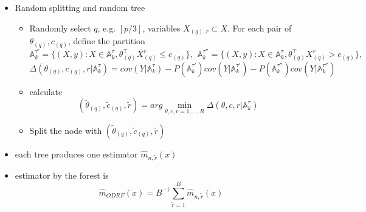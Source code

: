 \documentclass[nojss]{jss}
\numberwithin{equation}{section}
\begin{document}
\begin{itemize}

\item Random splitting and random tree
\begin{itemize}

  \item Randomly select $q$, e.g. $[p/3]$, variables $  X_{(q), r} \subset X $.   For each pair of $ \theta_{(q)},c_{(q)} $, define the partition
  $$
    \mathbb{A}_{k}^{\tau'} = \{ (X, y): X \in \mathbb{A}_k^\tau, \theta_{(q)}^\top X_{(q)}^r \le c_{(q)}\}, \ \
    \mathbb{A}_{k}^{\tau''} = \{ (X, y): X \in \mathbb{A}_k^\tau, \theta_{(q)}^\top X_{(q)}^r > c_{(q)}\},
  $$
  $$
  \Delta(\theta_{(q)},c_{(q)}, r| \mathbb{A}_k^\tau)= cov(Y|\mathbb{A}_k^\tau) - P(\mathbb{A}_k^{\tau'})cov(Y|\mathbb{A}_k^{\tau'}) - P(\mathbb{A}_k^{\tau''})cov(Y|\mathbb{A}_k^{\tau''})
   $$
 \item  calculate
   $$
    (\tilde \theta_{(q)}, \tilde c_{(q)}, \tilde r) =arg  \min_{ \theta, c, r=1,..., R} \Delta(\theta,c, r| \mathbb{A}_k^\tau)
   $$
 \item Split the node with $ (\tilde \theta_{(q)}, \tilde c_{(q)}, \tilde r) $
\end{itemize}

  \item each tree produces one estimator $ \hat m_{n, \tilde r} (x) $

  \item estimator by the forest is
  $$
    \hat m_{ODRF}(x) = B^{-1} \sum_{\tilde r=1}^B \hat m_{n, \tilde r} (x)
  $$


\end{itemize}



\end{document}
